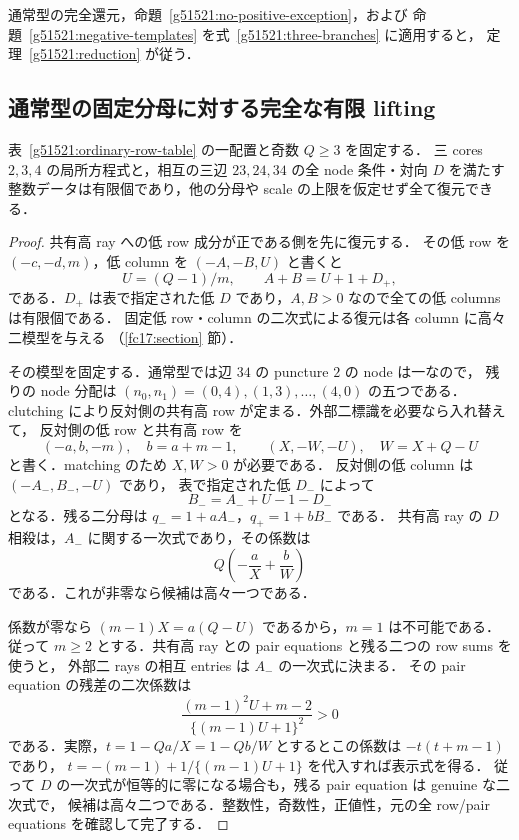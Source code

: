 通常型の完全還元，命題~\ref{g51521:no-positive-exception}，および
命題~\ref{g51521:negative-templates} を式~\eqref{g51521:three-branches} に適用すると，
定理~\ref{g51521:reduction} が従う．

\subsection{通常型の固定分母に対する完全な有限 lifting}

\begin{proposition}\label{g51521:fixed-Q-finite}
表~\ref{g51521:ordinary-row-table} の一配置と奇数 $Q\ge3$ を固定する．
三 cores $2,3,4$ の局所方程式と，相互の三辺 $23,24,34$ の全 node 条件・対向 $D$ を満たす
整数データは有限個であり，他の分母や scale の上限を仮定せず全て復元できる．
\end{proposition}
\begin{proof}
共有高 ray への低 row 成分が正である側を先に復元する．
その低 row を $(-c,-d,m)$，低 column を $(-A,-B,U)$ と書くと
\[
 U=(Q-1)/m,\qquad A+B=U+1+D_+,
\]
である．$D_+$ は表で指定された低 $D$ であり，$A,B>0$ なので全ての低 columns は有限個である．
固定低 row・column の二次式による復元は各 column に高々二模型を与える
（\ref{fc17:section} 節）．

その模型を固定する．通常型では辺 $34$ の puncture $2$ の node は一なので，
残りの node 分配は $(n_0,n_1)=(0,4),(1,3),\ldots,(4,0)$ の五つである．
clutching により反対側の共有高 row が定まる．外部二標識を必要なら入れ替えて，
反対側の低 row と共有高 row を
\[
 (-a,b,-m),\quad b=a+m-1,\qquad (X,-W,-U),\quad W=X+Q-U
\]
と書く．matching のため $X,W>0$ が必要である．
反対側の低 column は $(-A_-,B_-,-U)$ であり，
表で指定された低 $D_-$ によって
\[
 B_-=A_-+U-1-D_-
\]
となる．残る二分母は $q_-=1+aA_-$，$q_+=1+bB_-$ である．
共有高 ray の $D$ 相殺は，$A_-$ に関する一次式であり，その係数は
\[
 Q\left(-\frac aX+\frac bW\right)
\]
である．これが非零なら候補は高々一つである．

係数が零なら $(m-1)X=a(Q-U)$ であるから，$m=1$ は不可能である．
従って $m\ge2$ とする．共有高 ray との pair equations と残る二つの row sums を使うと，
外部二 rays の相互 entries は $A_-$ の一次式に決まる．
その pair equation の残差の二次係数は
\[
 \frac{(m-1)^2U+m-2}{\{(m-1)U+1\}^2}>0
\]
である．実際，$t=1-Qa/X=1-Qb/W$ とするとこの係数は
$-t(t+m-1)$ であり，
$t=-(m-1)+1/\{(m-1)U+1\}$ を代入すれば表示式を得る．
従って $D$ の一次式が恒等的に零になる場合も，残る pair equation は genuine な二次式で，
候補は高々二つである．整数性，奇数性，正値性，元の全 row/pair equations を確認して完了する．
\end{proof}

